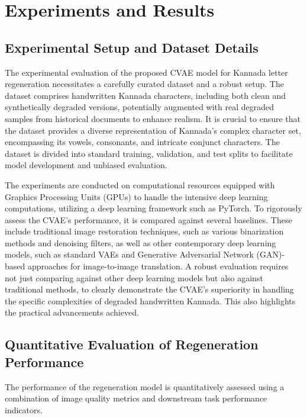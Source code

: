 \documentclass[conference]{IEEEtran}
\begin{document}
\section{Experiments and Results}

\subsection{Experimental Setup and Dataset Details}
\justify
The experimental evaluation of the proposed CVAE model for Kannada letter regeneration necessitates a carefully curated dataset and a robust setup. The dataset comprises handwritten Kannada characters, including both clean and synthetically degraded versions, potentially augmented with real degraded samples from historical documents to enhance realism.\cite{Bhunia2023, Hebbi2023} It is crucial to ensure that the dataset provides a diverse representation of Kannada's complex character set, encompassing its vowels, consonants, and intricate conjunct characters.\cite{Ahmed2024} The dataset is divided into standard training, validation, and test splits to facilitate model development and unbiased evaluation.

The experiments are conducted on computational resources equipped with Graphics Processing Units (GPUs) to handle the intensive deep learning computations, utilizing a deep learning framework such as PyTorch.\cite{Kumar2020} To rigorously assess the CVAE's performance, it is compared against several baselines. These include traditional image restoration techniques, such as various binarization methods and denoising filters, as well as other contemporary deep learning models, such as standard VAEs and Generative Adversarial Network (GAN)-based approaches for image-to-image translation.\cite{Emuru2023} A robust evaluation requires not just comparing against other deep learning models but also against traditional methods, to clearly demonstrate the CVAE's superiority in handling the specific complexities of degraded handwritten Kannada. This also highlights the practical advancements achieved.

\subsection{Quantitative Evaluation of Regeneration Performance}
\justify
The performance of the regeneration model is quantitatively assessed using a combination of image quality metrics and downstream task performance indicators.
\end{document}
